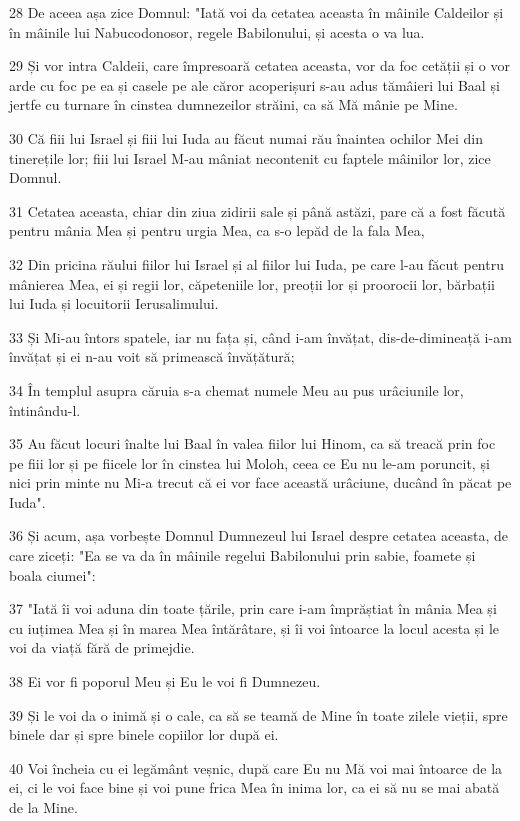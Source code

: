 \par 28 De aceea așa zice Domnul: "Iată voi da cetatea aceasta în mâinile Caldeilor și în mâinile lui Nabucodonosor, regele Babilonului, și acesta o va lua.
\par 29 Și vor intra Caldeii, care împresoară cetatea aceasta, vor da foc cetății și o vor arde cu foc pe ea și casele pe ale căror acoperișuri s-au adus tămâieri lui Baal și jertfe cu turnare în cinstea dumnezeilor străini, ca să Mă mânie pe Mine.
\par 30 Că fiii lui Israel și fiii lui Iuda au făcut numai rău înaintea ochilor Mei din tinerețile lor; fiii lui Israel M-au mâniat necontenit cu faptele mâinilor lor, zice Domnul.
\par 31 Cetatea aceasta, chiar din ziua zidirii sale și până astăzi, pare că a fost făcută pentru mânia Mea și pentru urgia Mea, ca s-o lepăd de la fala Mea,
\par 32 Din pricina răului fiilor lui Israel și al fiilor lui Iuda, pe care l-au făcut pentru mânierea Mea, ei și regii lor, căpeteniile lor, preoții lor și proorocii lor, bărbații lui Iuda și locuitorii Ierusalimului.
\par 33 Și Mi-au întors spatele, iar nu fața și, când i-am învățat, dis-de-dimineață i-am învățat și ei n-au voit să primească învățătură;
\par 34 În templul asupra căruia s-a chemat numele Meu au pus urâciunile lor, întinându-l.
\par 35 Au făcut locuri înalte lui Baal în valea fiilor lui Hinom, ca să treacă prin foc pe fiii lor și pe fiicele lor în cinstea lui Moloh, ceea ce Eu nu le-am poruncit, și nici prin minte nu Mi-a trecut că ei vor face această urâciune, ducând în păcat pe Iuda".
\par 36 Și acum, așa vorbește Domnul Dumnezeul lui Israel despre cetatea aceasta, de care ziceți: "Ea se va da în mâinile regelui Babilonului prin sabie, foamete și boala ciumei":
\par 37 "Iată îi voi aduna din toate țările, prin care i-am împrăștiat în mânia Mea și cu iuțimea Mea și în marea Mea întărâtare, și îi voi întoarce la locul acesta și le voi da viață fără de primejdie.
\par 38 Ei vor fi poporul Meu și Eu le voi fi Dumnezeu.
\par 39 Și le voi da o inimă și o cale, ca să se teamă de Mine în toate zilele vieții, spre binele dar și spre binele copiilor lor după ei.
\par 40 Voi încheia cu ei legământ veșnic, după care Eu nu Mă voi mai întoarce de la ei, ci le voi face bine și voi pune frica Mea în inima lor, ca ei să nu se mai abată de la Mine.
